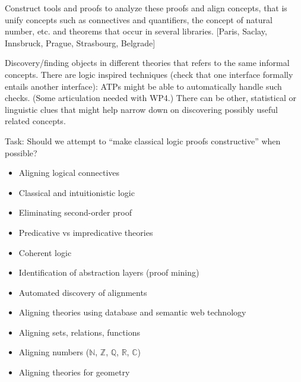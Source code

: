 \begin{workpackage}[id=alignment,wphases=0-48,type=RTD,
  short=Concept Alignment,%
  title=Concept Alignment,
  lead=Pra,
  PraRM=10]
\begin{wpdescription}
  Construct tools and proofs to analyze these proofs and align
  concepts, that is unify concepts such as connectives and
  quantifiers, the concept of natural number, etc. and theorems that
  occur in several libraries.  [Paris, Saclay, Innsbruck, Prague,
  Strasbourg, Belgrade]

  Discovery/finding objects in different theories that refers to the
  same informal concepts.  There are logic inspired techniques (check
  that one interface formally entails another interface): ATPs might
  be able to automatically handle such checks. (Some articulation
  needed with WP4.)  There can be other, statistical or linguistic
  clues that might help narrow down on discovering possibly useful
  related concepts.

\end{wpdescription}

Task: Should we attempt to ``make classical logic proofs
constructive'' when possible?

\begin{tasklist}
  \begin{task}[id=alignlogic,title=Alignment of logical foundations,lead=Lee]
    \begin{itemize}
    \item Aligning logical connectives
    \item Classical and intuitionistic logic
    \item Eliminating second-order proof
    \item Predicative vs impredicative theories
    \item Coherent logic
    \item Identification of abstraction layers (proof mining)
    \end{itemize}
  \end{task}


  \begin{task}[id=aligntheories,title=Automated theory alignment,lead=Inr]
    \begin{itemize}
    \item Automated discovery of alignments
    \item Aligning theories using database and semantic web technology
    \end{itemize}
  \end{task}

  \begin{task}[id=aligncasestudies,title=Case studies,lead=Str]
    \begin{itemize}
    \item Aligning sets, relations, functions
    \item Aligning numbers ($\mathbb{N}$, $\mathbb{Z}$, $\mathbb{Q}$,
      $\mathbb{R}$, $\mathbb{C}$)
    \item Aligning theories for geometry
    \end{itemize}
  \end{task}


\end{tasklist}
\end{workpackage}
